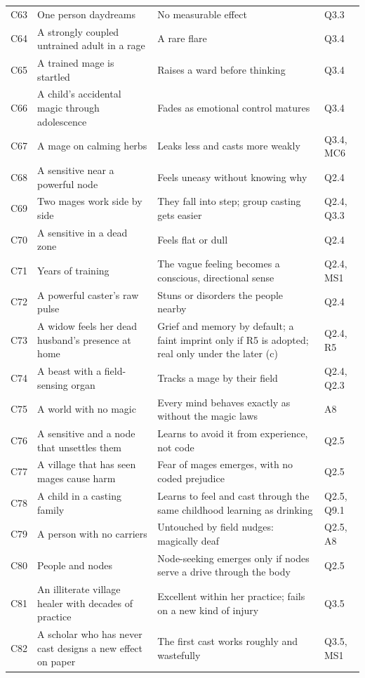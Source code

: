 \begin{longtable}{@{}>{\raggedright\arraybackslash}p{}>{\raggedright\arraybackslash}p{}>{\raggedright\arraybackslash}p{}>{\raggedright\arraybackslash}p{}@{}}
C63 & One person daydreams & No measurable effect & Q3.3\\
C64 & A strongly coupled untrained adult in a rage & A rare flare & Q3.4\\
C65 & A trained mage is startled & Raises a ward before thinking & Q3.4\\
C66 & A child's accidental magic through adolescence & Fades as emotional control matures & Q3.4\\
C67 & A mage on calming herbs & Leaks less and casts more weakly & Q3.4, MC6\\
C68 & A sensitive near a powerful node & Feels uneasy without knowing why & Q2.4\\
C69 & Two mages work side by side & They fall into step; group casting gets easier & Q2.4, Q3.3\\
C70 & A sensitive in a dead zone & Feels flat or dull & Q2.4\\
C71 & Years of training & The vague feeling becomes a conscious, directional sense & Q2.4, MS1\\
C72 & A powerful caster's raw pulse & Stuns or disorders the people nearby & Q2.4\\
C73 & A widow feels her dead husband's presence at home & Grief and memory by default; a faint imprint only if R5 is adopted; real only under the later (c) & Q2.4, R5\\
C74 & A beast with a field-sensing organ & Tracks a mage by their field & Q2.4, Q2.3\\
C75 & A world with no magic & Every mind behaves exactly as without the magic laws & A8\\
C76 & A sensitive and a node that unsettles them & Learns to avoid it from experience, not code & Q2.5\\
C77 & A village that has seen mages cause harm & Fear of mages emerges, with no coded prejudice & Q2.5\\
C78 & A child in a casting family & Learns to feel and cast through the same childhood learning as drinking & Q2.5, Q9.1\\
C79 & A person with no carriers & Untouched by field nudges: magically deaf & Q2.5, A8\\
C80 & People and nodes & Node-seeking emerges only if nodes serve a drive through the body & Q2.5\\
C81 & An illiterate village healer with decades of practice & Excellent within her practice; fails on a new kind of injury & Q3.5\\
C82 & A scholar who has never cast designs a new effect on paper & The first cast works roughly and wastefully & Q3.5, MS1\\

\end{longtable}

